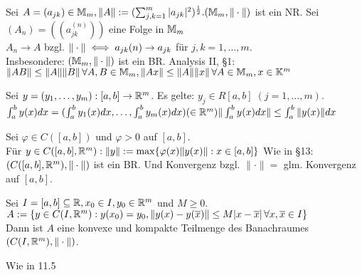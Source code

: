 \documentclass[a4paper,twoside,DIV15,BCOR12mm]{scrbook}
\begin{document}
\begin{definition}
Sei $A = (a_{jk}) \in \mathbb{M}_m , \|A\| := (\sum_{j,k =1}^{m} |a_{jk}|^2)^\frac{1}{2}. \\
(\mathbb{M}_m, \|\cdot\|)$ ist ein NR. Sei $(A_n) = ((a_{jk}^{(n)}))$ eine Folge in $\mathbb{M}_m$ \\
$A_n \rightarrow A$ bzgl. $\|\cdot\| \iff a_{jk}(n) \rightarrow a_{jk}$ für $j, k = 1,\ldots,m.$ \\
Insbesondere: $(\mathbb{M}_m, \|\cdot\|)$ ist ein BR.
Analysis II, §1: \\
$\|AB\| \leq \|A\| \|B\| \, \forall A, B \in \mathbb{M}_m, \|Ax\| \leq \|A\| \|x\| \, \forall A \in \mathbb{M}_m, x \in \mathbb{K}^m$
\end{definition}

\begin{erinnerung} [Analysis II, §12]
Sei $y = (y_1,\ldots, y_m): [a, b] \rightarrow \mathbb{R}^m$. Es gelte: $y_j \in R [a, b] \; (j = 1, \ldots, m)$. $\int_{a}^{b} y(x) dx = (\int_{a}^{b}y_1(x) dx, \ldots, \int_{a}^{b} y_m(x) dx) (\in \mathbb{R}^m) \\
\|\int_{a}^{b} y(x) dx\| \leq \int_{a}^{b} \|y(x)\| dx$
\end{erinnerung}

\begin{definition}
Sei $\varphi \in C([a, b])$ und $\varphi > 0$ auf $[a, b]$. \\ 
Für $y \in C([a, b], \mathbb{R}^m) : \|y\|:=\max\{\varphi(x) \|y(x)\|: x \in [a, b]\}$
Wie in §13:  $(C([a, b], \mathbb{R}^m), \|\cdot\|)$ ist ein BR. Und Konvergenz bzgl. $\|\cdot\| = $ glm. Konvergenz auf $[a, b]$.
\end{definition}

\begin{satz}
Sei $I = [a, b] \subseteq \mathbb{R}, x_0 \in I, y_0 \in \mathbb{R}^m$ und $M \geq 0$. \\
$A := \{y \in C(I, \mathbb{R}^m): y(x_0) = y_0, \|y(x)-y(\overline{x})\| \leq M|x - \overline{x}| \, \forall x, \overline{x} \in I\}$\\
Dann ist $A$ eine konvexe und kompakte Teilmenge des Banachraumes $(C(I,\mathbb{R}^m), \|\cdot\|)$.
\end{satz}

\begin{beweis}
Wie in 11.5
\end{beweis}
\end{document}
